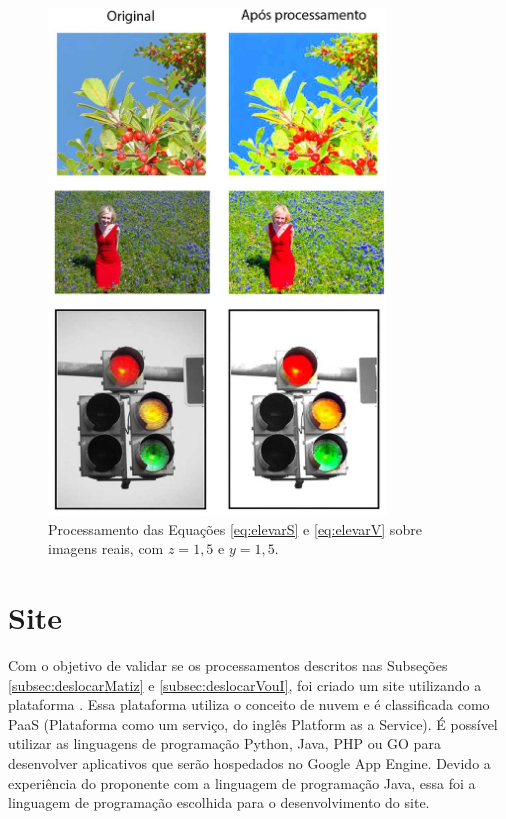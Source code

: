 \documentclass[	12pt, Times, openright, twoside, a4paper, english, brazil]{abntex2}
\begin{document}
\begin{figure}[!htb]
\centering \includegraphics[width=0.80\textwidth]{figuraRealSeV15.jpg}
\caption{Processamento das Equações \ref{eq:elevarS} e \ref{eq:elevarV} sobre imagens reais, com $z = 1,5$ e $y = 1,5$. \label{fig:figuraRealVeS}}
\end{figure}

\section{Site}

Com o objetivo de validar se os processamentos descritos nas Subseções \ref{subsec:deslocarMatiz} e \ref{subsec:deslocarVouI}, foi criado um site utilizando a plataforma . Essa plataforma utiliza o conceito de nuvem e é classificada como PaaS (Plataforma como um serviço, do inglês Platform as a Service). É possível utilizar as linguagens de programação Python, Java, PHP ou GO para desenvolver aplicativos que serão hospedados no Google App Engine. Devido a experiência do proponente com a linguagem de programação Java, essa foi a linguagem de programação escolhida para o desenvolvimento do site. 
\end{document}
